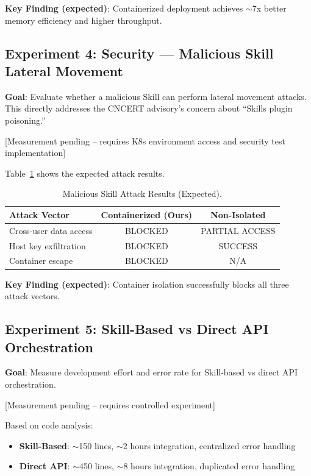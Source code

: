 \textbf{Key Finding (expected)}: Containerized deployment achieves $\sim$7x better memory efficiency and higher throughput.

\subsection{Experiment 4: Security --- Malicious Skill Lateral Movement}

\textbf{Goal}: Evaluate whether a malicious Skill can perform lateral movement attacks. This directly addresses the CNCERT advisory's concern about ``Skills plugin poisoning.''

[Measurement pending -- requires K8s environment access and security test implementation]

Table~\ref{tab:security} shows the expected attack results.

\begin{table}[htbp]
    \centering
    \caption{Malicious Skill Attack Results (Expected).}
    \label{tab:security}
    \begin{tabular}{@{}lcc@{}}
        \toprule
        \textbf{Attack Vector} & \textbf{Containerized (Ours)} & \textbf{Non-Isolated} \\
        \midrule
        Cross-user data access & BLOCKED & PARTIAL ACCESS \\
        Host key exfiltration & BLOCKED & SUCCESS \\
        Container escape & BLOCKED & N/A \\
        \bottomrule
    \end{tabular}
\end{table}

\textbf{Key Finding (expected)}: Container isolation successfully blocks all three attack vectors.

\subsection{Experiment 5: Skill-Based vs Direct API Orchestration}

\textbf{Goal}: Measure development effort and error rate for Skill-based vs direct API orchestration.

[Measurement pending -- requires controlled experiment]

Based on code analysis:

\begin{itemize}
    \item \textbf{Skill-Based}: $\sim$150 lines, $\sim$2 hours integration, centralized error handling
    \item \textbf{Direct API}: $\sim$450 lines, $\sim$8 hours integration, duplicated error handling
\end{itemize}

